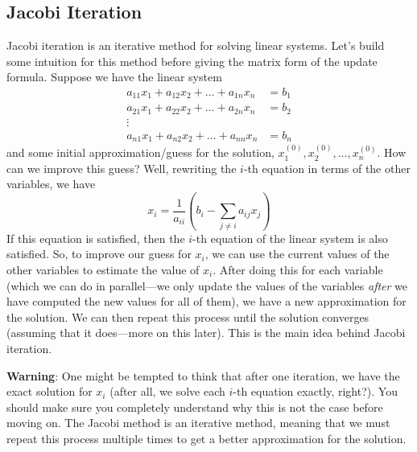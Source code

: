 \subsection{Jacobi Iteration}
Jacobi iteration is an iterative method for solving linear systems. Let's build some intuition for this method before giving the matrix form of the update formula. Suppose we have the linear system
\begin{align*}
    a_{11}x_1 + a_{12}x_2 + \dots + a_{1n}x_n & = b_1 \\
    a_{21}x_1 + a_{22}x_2 + \dots + a_{2n}x_n & = b_2 \\
    \vdots & \\
    a_{n1}x_1 + a_{n2}x_2 + \dots + a_{nn}x_n & = b_n
\end{align*}
and some initial approximation/guess for the solution, $ x_1^{(0)}, x_2^{(0)}, \dots, x_n^{(0)} $. How can we improve this guess? Well, rewriting the $i$-th equation in terms of the other variables, we have
\begin{equation*}
    x_i = \frac{1}{a_{ii}} \left( b_i - \sum_{j \neq i} a_{ij}x_j \right)
\end{equation*}
If this equation is satisfied, then the $i$-th equation of the linear system is also satisfied. So, to improve our guess for $x_i$, we can use the current values of the other variables to estimate the value of $x_i$. After doing this for each variable (which we can do in parallel---we only update the values of the variables \textit{after} we have computed the new values for all of them), we have a new approximation for the solution. We can then repeat this process until the solution converges (assuming that it does---more on this later). This is the main idea behind Jacobi iteration.
\begin{warningBox}
    \textbf{Warning}: One might be tempted to think that after one iteration, we have the exact solution for $x_i$ (after all, we solve each $i$-th equation exactly, right?). You should make sure you completely understand why this is not the case before moving on. The Jacobi method is an iterative method, meaning that we must repeat this process multiple times to get a better approximation for the solution.
\end{warningBox}


